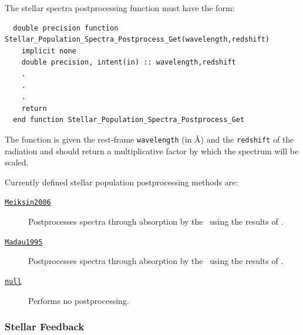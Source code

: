 The stellar spectra postprocessing function must have the form:
\begin{verbatim}
  double precision function Stellar_Population_Spectra_Postprocess_Get(wavelength,redshift)
    implicit none
    double precision, intent(in) :: wavelength,redshift
    .
    .
    .
    return
  end function Stellar_Population_Spectra_Postprocess_Get
\end{verbatim}
The function is given the rest-frame {\tt wavelength} (in \AA) and the {\tt redshift} of the radiation and should return a multiplicative factor by which the spectrum will be scaled.

Currently defined stellar population postprocessing methods are:
\begin{description}
\item [\hyperlink{stellar_populations.spectra.postprocess.Meiksin2006.F90:stellar_population_spectra_postprocess_meiksin2006}{{\tt Meiksin2006}}] Postprocesses spectra through absorption by the \IGM\ using the results of \cite{meiksin_colour_2006}.
\item [\hyperlink{stellar_populations.spectra.postprocess.Madau1995.F90:stellar_population_spectra_postprocess_madau1995}{{\tt Madau1995}}] Postprocesses spectra through absorption by the \IGM\ using the results of \cite{madau_radiative_1995}.
\item [\hyperlink{stellar_populations.spectra.postprocess.null.F90:stellar_population_spectra_postprocess_null}{{\tt null}}] Performs no postprocessing.
\end{description}

\subsubsection{Stellar Feedback}

